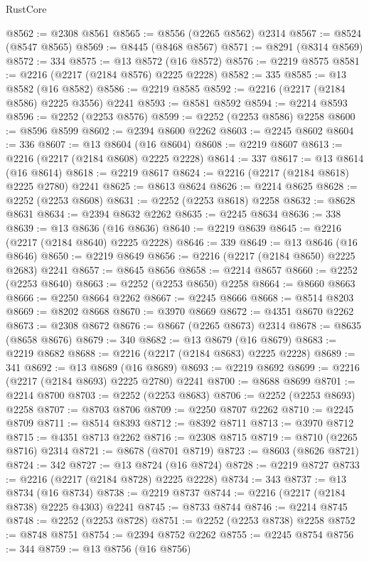 \begin{lexlean}{RustCore}
\begin{coremodule}
@8562 := @2308 @8561
@8565 := @8556 (@2265 @8562) @2314
@8567 := @8524 (@8547 @8565)
@8569 := @8445 (@8468 @8567)
@8571 := @8291 (@8314 @8569)
@8572 := 334
@8575 := @13 @8572 (@16 @8572)
@8576 := @2219 @8575
@8581 := @2216 (@2217 (@2184 @8576) @2225 @2228)
@8582 := 335
@8585 := @13 @8582 (@16 @8582)
@8586 := @2219 @8585
@8592 := @2216 (@2217 (@2184 @8586) @2225 @3556) @2241
@8593 := @8581 @8592
@8594 := @2214 @8593
@8596 := @2252 (@2253 @8576)
@8599 := @2252 (@2253 @8586) @2258
@8600 := @8596 @8599
@8602 := @2394 @8600 @2262
@8603 := @2245 @8602
@8604 := 336
@8607 := @13 @8604 (@16 @8604)
@8608 := @2219 @8607
@8613 := @2216 (@2217 (@2184 @8608) @2225 @2228)
@8614 := 337
@8617 := @13 @8614 (@16 @8614)
@8618 := @2219 @8617
@8624 := @2216 (@2217 (@2184 @8618) @2225 @2780) @2241
@8625 := @8613 @8624
@8626 := @2214 @8625
@8628 := @2252 (@2253 @8608)
@8631 := @2252 (@2253 @8618) @2258
@8632 := @8628 @8631
@8634 := @2394 @8632 @2262
@8635 := @2245 @8634
@8636 := 338
@8639 := @13 @8636 (@16 @8636)
@8640 := @2219 @8639
@8645 := @2216 (@2217 (@2184 @8640) @2225 @2228)
@8646 := 339
@8649 := @13 @8646 (@16 @8646)
@8650 := @2219 @8649
@8656 := @2216 (@2217 (@2184 @8650) @2225 @2683) @2241
@8657 := @8645 @8656
@8658 := @2214 @8657
@8660 := @2252 (@2253 @8640)
@8663 := @2252 (@2253 @8650) @2258
@8664 := @8660 @8663
@8666 := @2250 @8664 @2262
@8667 := @2245 @8666
@8668 := @8514 @8203
@8669 := @8202 @8668
@8670 := @3970 @8669
@8672 := @4351 @8670 @2262
@8673 := @2308 @8672
@8676 := @8667 (@2265 @8673) @2314
@8678 := @8635 (@8658 @8676)
@8679 := 340
@8682 := @13 @8679 (@16 @8679)
@8683 := @2219 @8682
@8688 := @2216 (@2217 (@2184 @8683) @2225 @2228)
@8689 := 341
@8692 := @13 @8689 (@16 @8689)
@8693 := @2219 @8692
@8699 := @2216 (@2217 (@2184 @8693) @2225 @2780) @2241
@8700 := @8688 @8699
@8701 := @2214 @8700
@8703 := @2252 (@2253 @8683)
@8706 := @2252 (@2253 @8693) @2258
@8707 := @8703 @8706
@8709 := @2250 @8707 @2262
@8710 := @2245 @8709
@8711 := @8514 @8393
@8712 := @8392 @8711
@8713 := @3970 @8712
@8715 := @4351 @8713 @2262
@8716 := @2308 @8715
@8719 := @8710 (@2265 @8716) @2314
@8721 := @8678 (@8701 @8719)
@8723 := @8603 (@8626 @8721)
@8724 := 342
@8727 := @13 @8724 (@16 @8724)
@8728 := @2219 @8727
@8733 := @2216 (@2217 (@2184 @8728) @2225 @2228)
@8734 := 343
@8737 := @13 @8734 (@16 @8734)
@8738 := @2219 @8737
@8744 := @2216 (@2217 (@2184 @8738) @2225 @4303) @2241
@8745 := @8733 @8744
@8746 := @2214 @8745
@8748 := @2252 (@2253 @8728)
@8751 := @2252 (@2253 @8738) @2258
@8752 := @8748 @8751
@8754 := @2394 @8752 @2262
@8755 := @2245 @8754
@8756 := 344
@8759 := @13 @8756 (@16 @8756)

\end{coremodule}
\end{lexlean}

